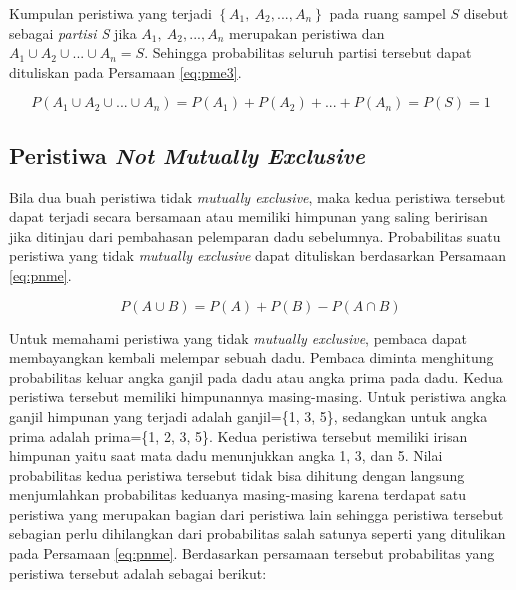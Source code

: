\documentclass[]{book}
\begin{document}
Kumpulan peristiwa yang terjadi \(\left\{A_1,\ A_2,...,A_n\right\}\)
pada ruang sampel \(S\) disebut sebagai \emph{partisi S} jika
\(A_1,\ A_2,...,A_n\) merupakan peristiwa dan
\(A_1\cup A_2\cup...\cup A_n=S\). Sehingga probabilitas seluruh partisi
tersebut dapat dituliskan pada Persamaan \eqref{eq:pme3}.

\begin{equation}
   P\left(A_1\cup A_2\cup...\cup A_n\right)=P\left(A_1\right)+P\left(A_2\right)+...+P\left(A_n\right)=P\left(S\right)=1
  \label{eq:pme3}
\end{equation}

\subsection{\texorpdfstring{Peristiwa \emph{Not Mutually
Exclusive}}{Peristiwa Not Mutually Exclusive}}\label{peristiwa-not-mutually-exclusive}

Bila dua buah peristiwa tidak \emph{mutually exclusive}, maka kedua
peristiwa tersebut dapat terjadi secara bersamaan atau memiliki himpunan
yang saling beririsan jika ditinjau dari pembahasan pelemparan dadu
sebelumnya. Probabilitas suatu peristiwa yang tidak \emph{mutually
exclusive} dapat dituliskan berdasarkan Persamaan \eqref{eq:pnme}.

\begin{equation}
   P\left(A\cup B\right)=P\left(A\right)+P\left(B\right)-P\left(A\cap B\right)
  \label{eq:pnme}
\end{equation}

Untuk memahami peristiwa yang tidak \emph{mutually exclusive}, pembaca
dapat membayangkan kembali melempar sebuah dadu. Pembaca diminta
menghitung probabilitas keluar angka ganjil pada dadu atau angka prima
pada dadu. Kedua peristiwa tersebut memiliki himpunannya masing-masing.
Untuk peristiwa angka ganjil himpunan yang terjadi adalah ganjil=\{1, 3,
5\}, sedangkan untuk angka prima adalah prima=\{1, 2, 3, 5\}. Kedua
peristiwa tersebut memiliki irisan himpunan yaitu saat mata dadu
menunjukkan angka 1, 3, dan 5. Nilai probabilitas kedua peristiwa
tersebut tidak bisa dihitung dengan langsung menjumlahkan probabilitas
keduanya masing-masing karena terdapat satu peristiwa yang merupakan
bagian dari peristiwa lain sehingga peristiwa tersebut sebagian perlu
dihilangkan dari probabilitas salah satunya seperti yang ditulikan pada
Persamaan \eqref{eq:pnme}. Berdasarkan persamaan tersebut probabilitas
yang peristiwa tersebut adalah sebagai berikut:
\end{document}
